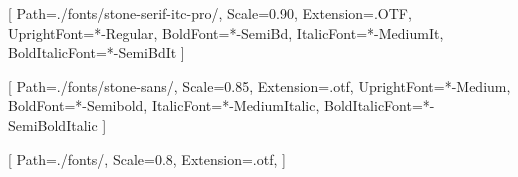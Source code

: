 \usepackage{setspace}

\raggedbottom

\setlength{\parskip}{0em plus 0em minus 0em}
\linespread{1.1}

\newcommand{\titleoriginal}{Broken Money}
\newcommand{\subtitleoriginal}{Why Our Financial System is Failing Us and How We Can Make it Better}
\newcommand{\yearoriginal}{2023}
\newcommand{\subtitletranslation}{XXX}
\newcommand{\yeartranslation}{2025}
\newcommand{\stringtranslation}{Traduzione}
\newcommand{\stringlicense}{Tutti i diritti riservati.}
\newcommand{\stringpublisher}{Pubblicato da}
\newcommand{\ISBNHC}{XXX}
\newcommand{\ISBNSC}{XXX}
\newcommand{\ISBNEBOOK}{XXX}
\newcommand{\ISBNAUDIO}{XXX}
\newcommand{\press}{Konsensus Network}
\newcommand{\translatorone}{XXX}
\newcommand{\translatortwo}{XXX}
\newcommand{\translators}{
\Large\sffamily\textbf{\stringtranslation:}\\
\textit\translatorone\\
\textit\translatortwo\\
}
\newcommand{\editors}{
  \Large\sffamily\textbf{Redactie:}\\
  \textit{Theo Hague}
}

\setstocksize{230mm}{155mm}
\settrimmedsize{224mm}{149mm}{*}
\setbinding{7mm}
\setlrmarginsandblock{15mm}{18mm}{*}
\setulmarginsandblock{20mm}{18mm}{*}

\usepackage{fontspec}
\setmainfont{stone-serif}[
    Path=./fonts/stone-serif-itc-pro/,
    Scale=0.90,
    Extension=.OTF,
    UprightFont=*-Regular,
    BoldFont=*-SemiBd,
    ItalicFont=*-MediumIt,
    BoldItalicFont=*-SemiBdIt
    ]

\setsansfont{stone-sans}[
    Path=./fonts/stone-sans/,
    Scale=0.85,
    Extension=.otf,
    UprightFont=*-Medium,
    BoldFont=*-Semibold,
    ItalicFont=*-MediumItalic,
    BoldItalicFont=*-SemiBoldItalic
    ]

\setmonofont{Consolas}

\newfontfamily{}[
    Path=./fonts/,
    Scale=0.8,
    Extension=.otf,
]

